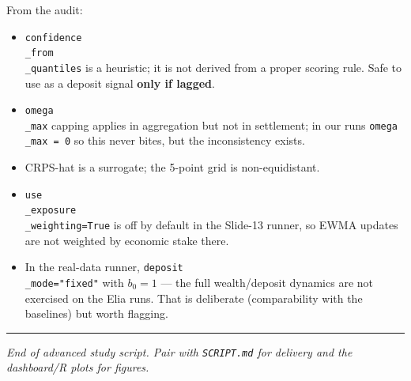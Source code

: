 \documentclass[11pt]{article}
\begin{document}
From the audit:

\begin{itemize}
\item \texttt{confidence\\_from\\_quantiles} is a heuristic; it is not derived from a proper scoring rule. Safe to use as a deposit signal \textbf{only if lagged}.
\item \texttt{omega\\_max} capping applies in aggregation but not in settlement; in our runs \texttt{omega\\_max = 0} so this never bites, but the inconsistency exists.
\item CRPS-hat is a surrogate; the 5-point grid is non-equidistant.
\item \texttt{use\\_exposure\\_weighting=True} is off by default in the Slide-13 runner, so EWMA updates are not weighted by economic stake there.
\item In the real-data runner, \texttt{deposit\\_mode="fixed"} with $b_0=1$ --- the full wealth/deposit dynamics are not exercised on the Elia runs. That is deliberate (comparability with the baselines) but worth flagging.
\end{itemize}

\bigskip\hrule\bigskip

\emph{End of advanced study script. Pair with \texttt{SCRIPT.md} for delivery and the dashboard/R plots for figures.}
\end{document}
